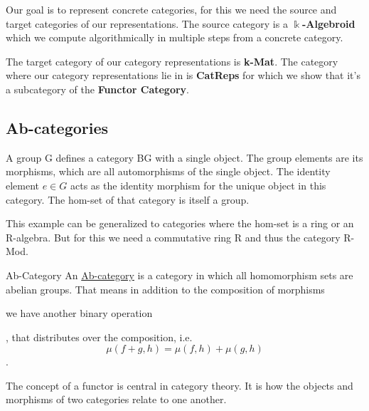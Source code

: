 
Our goal is to represent concrete categories, for this we need the source and target categories of our representations.
The source category is a \textbf{$\Bbbk$-Algebroid} which we compute algorithmically in multiple steps from a concrete category.

The target category of our category representations is \textbf{k-Mat}.
The category where our category representations lie in is \textbf{CatReps} for which we show that it's a subcategory of the
\textbf{Functor Category}.

\subsection{Ab-categories}

\begin{example}
A group G defines a category BG with a single object. The group elements are its morphisms, which are all automorphisms of the single object.
The identity element $e \in G$ acts as the identity morphism for the unique object in this category. The hom-set of that category is itself
a group.
\end{example}

This example can be generalized to categories where the hom-set is a ring or an R-algebra. But for this we need a commutative ring R and thus
the category R-Mod.

\begin{definition}{Ab-Category}
An \ul{Ab-category} is a category in which all homomorphism sets are abelian groups. That means in addition to the composition
of morphisms  we have another binary operation , that distributes over the composition, i.e. \[\mu(f+g,h) = \mu(f,h)+\mu(g,h)\].
\end{definition}

The concept of a functor is central in category theory. It is how the objects and morphisms of two categories relate to one another.

